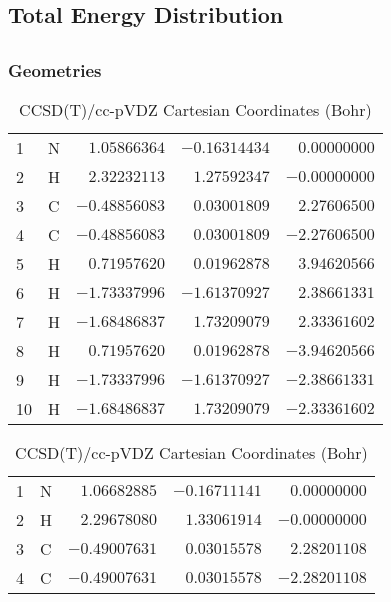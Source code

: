 \documentclass[10pt,oneside]{article}
\begin{document}
\begin{table}
\subsection*{Total Energy Distribution}
\centering\end{table}

\clearpage

\subsection{}

\begin{table}[h!]
\subsubsection*{Geometries}
\begin{multicols}{2}
\centering
\caption{CCSD(T)/cc-pVTZ Cartesian Coordinates (Bohr)}
\begin{tabular}{llrrr}
\toprule
1  & N  & $ 1.05866364$ & $-0.16314434$ & $ 0.00000000$ \\
2  & H  & $ 2.32232113$ & $ 1.27592347$ & $-0.00000000$ \\
3  & C  & $-0.48856083$ & $ 0.03001809$ & $ 2.27606500$ \\
4  & C  & $-0.48856083$ & $ 0.03001809$ & $-2.27606500$ \\
5  & H  & $ 0.71957620$ & $ 0.01962878$ & $ 3.94620566$ \\
6  & H  & $-1.73337996$ & $-1.61370927$ & $ 2.38661331$ \\
7  & H  & $-1.68486837$ & $ 1.73209079$ & $ 2.33361602$ \\
8  & H  & $ 0.71957620$ & $ 0.01962878$ & $-3.94620566$ \\
9  & H  & $-1.73337996$ & $-1.61370927$ & $-2.38661331$ \\
10 & H  & $-1.68486837$ & $ 1.73209079$ & $-2.33361602$ \\
\bottomrule
\end{tabular}
\caption{CCSD(T)/cc-pVDZ Cartesian Coordinates (Bohr)}
\begin{tabular}{llrrr}
\toprule
1  & N  & $ 1.06682885$ & $-0.16711141$ & $ 0.00000000$ \\
2  & H  & $ 2.29678080$ & $ 1.33061914$ & $-0.00000000$ \\
3  & C  & $-0.49007631$ & $ 0.03015578$ & $ 2.28201108$ \\
4  & C  & $-0.49007631$ & $ 0.03015578$ & $-2.28201108$ \\

\end{tabular}
\end{multicols}
\end{table}
\end{document}
